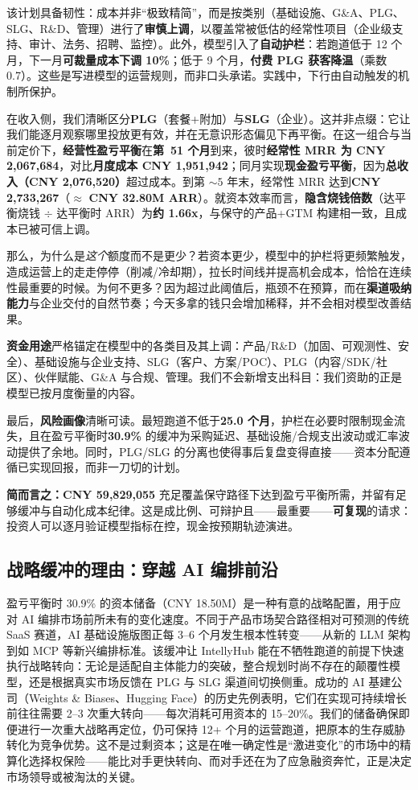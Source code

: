 \documentclass[11pt, a4paper, oneside]{article}
\begin{document}
该计划具备韧性：成本并非“极致精简”，而是按类别（基础设施、G\&A、PLG、SLG、R\&D、管理）进行了\textbf{审慎上调}，以覆盖常被低估的经常性项目（企业级支持、审计、法务、招聘、监控）。此外，模型引入了\textbf{自动护栏}：若跑道低于 12 个月，下一月\textbf{可裁量成本下调 10\%}；低于 9 个月，\textbf{付费 PLG 获客降温}（乘数 0.7）。这些是写进模型的运营规则，而非口头承诺。实践中，下行由自动触发的机制所保护。

在收入侧，我们清晰区分\textbf{PLG}（套餐+附加）与\textbf{SLG}（企业）。这并非点缀：它让我们能逐月观察哪里投放更有效，并在无意识形态偏见下再平衡。在这一组合与当前定价下，\textbf{经营性盈亏平衡}在\textbf{第~51 个月}到来，彼时\textbf{经常性 MRR 为 CNY 2{,}067{,}684}，对比\textbf{月度成本 CNY 1{,}951{,}942}；同月实现\textbf{现金盈亏平衡}，因为\textbf{总收入（CNY 2{,}076{,}520）}超过成本。到第 $\sim 5$ 年末，经常性 MRR 达到\textbf{CNY 2{,}733{,}267}（$\approx$ \textbf{CNY 32.80M ARR}）。就资本效率而言，\textbf{隐含烧钱倍数}（达平衡烧钱 $\div$ 达平衡时 ARR）为\textbf{约 1.66x}，与保守的产品+GTM 构建相一致，且成本已被可信上调。

那么，为什么是\emph{这个}额度而不是更少？若资本更少，模型中的护栏将更频繁触发，造成运营上的走走停停（削减/冷却期），拉长时间线并提高机会成本，恰恰在连续性最重要的时候。为何不更多？因为超过此阈值后，瓶颈不在预算，而在\textbf{渠道吸纳能力}与企业交付的自然节奏；今天多拿的钱只会增加稀释，并不会相对模型改善结果。

\textbf{资金用途}严格锚定在模型中的各类目及其上调：产品/R\&D（加固、可观测性、安全）、基础设施与企业支持、SLG（客户、方案/POC）、PLG（内容/SDK/社区）、伙伴赋能、G\&A 与合规、管理。我们不会新增支出科目：我们资助的正是模型已按月度衡量的内容。 

最后，\textbf{风险画像}清晰可读。最短跑道不低于\textbf{25.0 个月}，护栏在必要时限制现金流失，且在盈亏平衡时\textbf{30.9\%} 的缓冲为采购延迟、基础设施/合规支出波动或汇率波动提供了余地。同时，PLG/SLG 的分离也使得事后复盘变得直接——资本分配遵循已实现回报，而非一刀切的计划。

\textbf{简而言之：}\textbf{CNY 59{,}829{,}055} 充足覆盖保守路径下达到盈亏平衡所需，并留有足够缓冲与自动化成本纪律。这是成比例、可辩护且——最重要——\textbf{可复现}的请求：投资人可以逐月验证模型指标在控，现金按预期轨迹演进。

\subsection{战略缓冲的理由：穿越 AI 编排前沿}
盈亏平衡时 30.9\% 的资本储备（CNY 18.50M）是一种有意的战略配置，用于应对 AI 编排市场前所未有的变化速度。不同于产品市场契合路径相对可预测的传统 SaaS 赛道，AI 基础设施版图正每 3–6 个月发生根本性转变——从新的 LLM 架构到如 MCP 等新兴编排标准。该缓冲让 IntellyHub 能在不牺牲跑道的前提下快速执行战略转向：无论是适配自主体能力的突破，整合规划时尚不存在的颠覆性模型，还是根据真实市场反馈在 PLG 与 SLG 渠道间切换侧重。成功的 AI 基建公司（Weights \& Biases、Hugging Face）的历史先例表明，它们在实现可持续增长前往往需要 2–3 次重大转向——每次消耗可用资本的 15–20\%。我们的储备确保即便进行一次重大战略再定位，仍可保持 12+ 个月的运营跑道，把原本的生存威胁转化为竞争优势。这不是过剩资本；这是在唯一确定性是“激进变化”的市场中的精算化选择权保险——能比对手更快转向、而对手还在为了应急融资奔忙，正是决定市场领导或被淘汰的关键。
\end{document}
